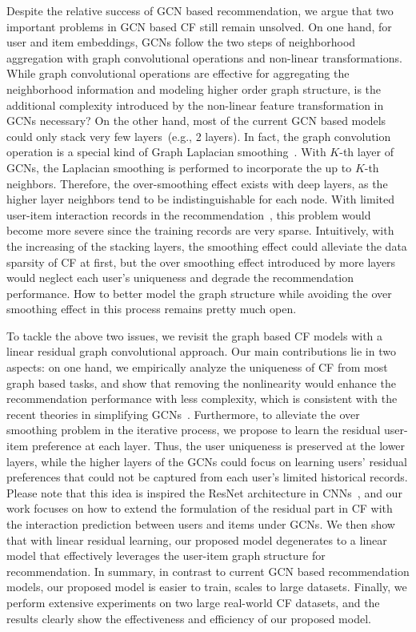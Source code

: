 \documentclass[letterpaper]{article} %
\begin{document}
Despite the relative success of GCN based recommendation, we argue that two important problems in GCN based CF still remain unsolved. On one hand, for user and item embeddings, GCNs follow the two steps of neighborhood aggregation with graph convolutional operations and non-linear transformations. While graph convolutional operations are effective for aggregating the neighborhood information and modeling higher order graph structure, is the additional complexity introduced by the non-linear feature transformation in GCNs necessary? On the other hand, most of the current GCN based models could only stack very few layers~(e.g., 2 layers).  In fact, the graph convolution operation is a special kind of Graph Laplacian smoothing~\cite{li2018deeper,klicpera2018predict}. With $K$-th layer of GCNs, the Laplacian smoothing is performed to incorporate the up to $K$-th neighbors. Therefore, the over-smoothing effect exists with deep layers, as the higher layer neighbors tend to be indistinguishable for each node. With limited user-item interaction records in the recommendation~\cite{wu2017modeling,wu2016relevance}, this problem would become more severe since the training records are very sparse. Intuitively, with the increasing of the stacking layers, the smoothing effect could alleviate the data sparsity of CF at first, but the over smoothing effect introduced by more layers would neglect each user's uniqueness and degrade the recommendation performance. How to better model the graph structure while avoiding the over smoothing effect in this process remains pretty much open.

 

To tackle the above two issues, we revisit the graph based CF models with a linear residual graph convolutional approach. Our main contributions lie in two aspects: on one hand, we empirically analyze the uniqueness of CF from most graph based tasks, and show that removing the nonlinearity would enhance the recommendation performance with less complexity, which is consistent with the recent theories in simplifying GCNs~\cite{ICML2019simplifying}. Furthermore, to alleviate the over smoothing problem in the iterative process, we propose to learn the residual user-item preference at each layer. Thus, the user uniqueness is preserved at the lower layers, while the higher layers of the GCNs could focus on learning users' residual preferences that could not be captured from each user's limited historical records. Please note that this idea is inspired the ResNet architecture in CNNs~\cite{CVPR2016resudial,wu2019wider}, and our work focuses on how to extend the formulation of the residual part in CF with the interaction prediction between users and items under GCNs. We then show that with linear residual learning, our proposed model degenerates to a linear model that effectively leverages the user-item graph structure for recommendation. In summary, in contrast to current GCN based recommendation models, our proposed model is easier to train, scales to large datasets. Finally, we perform extensive experiments on two large real-world CF datasets, and the results clearly show the effectiveness and efficiency of our proposed model.
\end{document}
